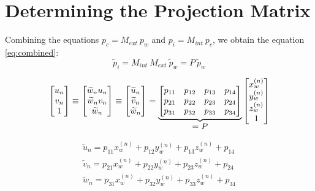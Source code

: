 \section{Determining the Projection Matrix}
Combining the equations $p_c = M_{ext}\:p_w$ and $p_i = M_{int}\:p_c$, we obtain the equation \ref{eq:combined}:
\begin{equation} \label{eq:combined}
    \widetilde{p}_{i} = M_{int}\:M_{ext}\:\widetilde{p}_{w} = P\:\widetilde{p}_{w}
\end{equation}

\begin{equation}
    \begin{bmatrix}
        u_n \\ v_n \\ 1
    \end{bmatrix}
    \equiv
    \begin{bmatrix}
        \widetilde{w}_n u_n \\ \widetilde{w}_n v_n \\ \widetilde{w}_n
    \end{bmatrix}
    \equiv
    \begin{bmatrix}
        \widetilde{u}_n \\ \widetilde{v}_n \\ \widetilde{w}_n
    \end{bmatrix}
    =
    \underbrace{
        \begin{bmatrix}
            p_{11} & p_{12} & p_{13} & p_{14} \\
            p_{21} & p_{22} & p_{23} & p_{24} \\
            p_{31} & p_{32} & p_{33} & p_{34}
        \end{bmatrix}
    }_{\mathlarger{=P}}
    \begin{bmatrix}
        x_w^{(n)} \\ y_w^{(n)} \\ z_w^{(n)} \\ 1
    \end{bmatrix}
\end{equation}


\begin{align*}
    \widetilde{u}_n = p_{11}x_w^{(n)} + p_{12}y_w^{(n)} + p_{13}z_w^{(n)} + p_{14} \\
    \widetilde{v}_n = p_{21}x_w^{(n)} + p_{22}y_w^{(n)} + p_{23}z_w^{(n)} + p_{24} \\
    \widetilde{w}_n = p_{31}x_w^{(n)} + p_{32}y_w^{(n)} + p_{33}z_w^{(n)} + p_{34}
\end{align*}

